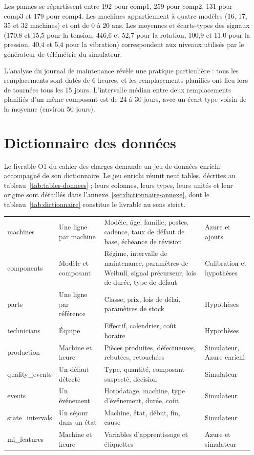 \documentclass[11pt,a4paper,oneside]{report}
\newcommand{\hd}[1]{\leavevmode{\sffamily\bfseries\color{primaire}#1}}
\begin{document}
Les pannes se répartissent entre 192 pour comp1, 259 pour comp2, 131 pour comp3 et 179 pour comp4. Les machines appartiennent à quatre modèles (16, 17, 35 et 32 machines) et ont de 0 à 20 ans. Les moyennes et écarts-types des signaux (170,8 et 15,5 pour la tension, 446,6 et 52,7 pour la rotation, 100,9 et 11,0 pour la pression, 40,4 et 5,4 pour la vibration) correspondent aux niveaux utilisés par le générateur de télémétrie du simulateur.

L'analyse du journal de maintenance révèle une pratique particulière : tous les remplacements sont datés de 6 heures, et les remplacements planifiés ont lieu lors de tournées tous les 15 jours. L'intervalle médian entre deux remplacements planifiés d'un même composant est de 24 à 30 jours, avec un écart-type voisin de la moyenne (environ 50 jours).

\section{Dictionnaire des données}\label{sec:dictionnaire}

Le livrable O1 du cahier des charges demande un jeu de données enrichi accompagné de son dictionnaire. Le jeu enrichi réunit neuf tables, décrites au tableau~\ref{tab:tables-donnees} ; leurs colonnes, leurs types, leurs unités et leur origine sont détaillés dans l'annexe~\ref{sec:dictionnaire-annexe}, dont le tableau~\ref{tab:dictionnaire} constitue le livrable au sens strict.

\begin{tabularx}{\linewidth}{@{}P{2.8cm} P{2.6cm} L P{2.9cm}@{}}
\caption{Tables du jeu de données enrichi}\label{tab:tables-donnees}\\
\toprule
\hd{Table} & \hd{Grain} & \hd{Contenu principal} & \hd{Origine} \\
\midrule
machines & Une ligne par machine & Modèle, âge, famille, postes, cadence, taux de défaut de base, échéance de révision & Azure et ajouts \\
components & Modèle et composant & Régime, intervalle de maintenance, paramètres de Weibull, signal précurseur, lois de durée, type de défaut & Calibration et hypothèses \\
parts & Une ligne par référence & Classe, prix, lois de délai, paramètres de stock & Hypothèses \\
technicians & Équipe & Effectif, calendrier, coût horaire & Hypothèses \\
production & Machine et heure & Pièces produites, défectueuses, rebutées, retouchées & Simulateur, Azure enrichi \\
quality\_events & Un défaut détecté & Type, quantité, composant suspecté, décision & Simulateur \\
events & Un événement & Horodatage, machine, type d'événement, durée, coût & Simulateur \\
state\_intervals & Un séjour dans un état & Machine, état, début, fin, cause & Simulateur \\
ml\_features & Machine et heure & Variables d'apprentissage et étiquettes & Azure et simulateur \\
\bottomrule
\end{tabularx}
\end{document}
